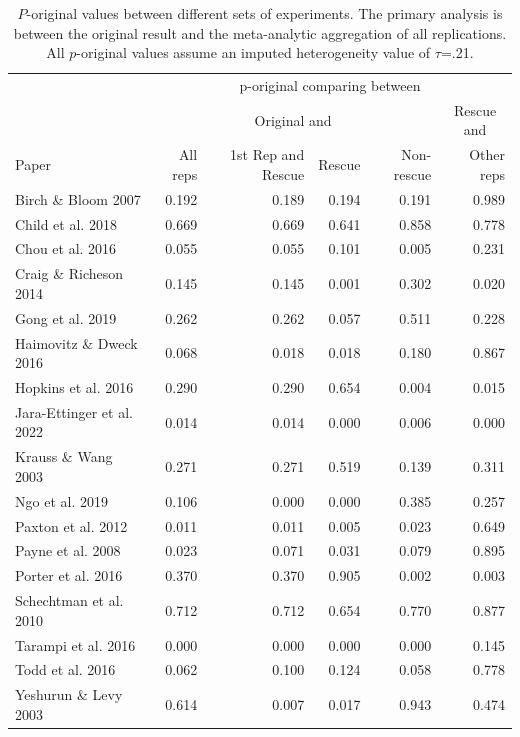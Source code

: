 \documentclass[
  english,
  a4paper,
]{article}
\begin{document}
\begin{table}

\caption{\label{tab:tab-porig}$P$-original values between different sets of experiments. The primary analysis is between the original result and the meta-analytic aggregation of all replications. All $p$-original values assume an imputed heterogeneity value of $\tau$=.21.}
\centering
\begin{tabular}[t]{lrrrrr}
\toprule
\multicolumn{1}{c}{ } & \multicolumn{5}{c}{p-original comparing between} \\
\cmidrule(l{3pt}r{3pt}){2-6}
\multicolumn{1}{c}{ } & \multicolumn{4}{c}{Original and} & \multicolumn{1}{c}{Rescue and} \\
\cmidrule(l{3pt}r{3pt}){2-5} \cmidrule(l{3pt}r{3pt}){6-6}
Paper & All reps & 1st Rep and Rescue & Rescue & Non-rescue & Other reps\\
\midrule
Birch \& Bloom 2007 & 0.192 & 0.189 & 0.194 & 0.191 & 0.989\\
Child et al. 2018 & 0.669 & 0.669 & 0.641 & 0.858 & 0.778\\
Chou et al. 2016 & 0.055 & 0.055 & 0.101 & 0.005 & 0.231\\
Craig \& Richeson 2014 & 0.145 & 0.145 & 0.001 & 0.302 & 0.020\\
Gong et al. 2019 & 0.262 & 0.262 & 0.057 & 0.511 & 0.228\\
Haimovitz \& Dweck 2016 & 0.068 & 0.018 & 0.018 & 0.180 & 0.867\\
Hopkins et al. 2016 & 0.290 & 0.290 & 0.654 & 0.004 & 0.015\\
Jara-Ettinger et al. 2022 & 0.014 & 0.014 & 0.000 & 0.006 & 0.000\\
Krauss \& Wang 2003 & 0.271 & 0.271 & 0.519 & 0.139 & 0.311\\
Ngo et al. 2019 & 0.106 & 0.000 & 0.000 & 0.385 & 0.257\\
Paxton et al. 2012 & 0.011 & 0.011 & 0.005 & 0.023 & 0.649\\
Payne et al. 2008 & 0.023 & 0.071 & 0.031 & 0.079 & 0.895\\
Porter et al. 2016 & 0.370 & 0.370 & 0.905 & 0.002 & 0.003\\
Schechtman et al. 2010 & 0.712 & 0.712 & 0.654 & 0.770 & 0.877\\
Tarampi et al. 2016 & 0.000 & 0.000 & 0.000 & 0.000 & 0.145\\
Todd et al. 2016 & 0.062 & 0.100 & 0.124 & 0.058 & 0.778\\
Yeshurun \& Levy 2003 & 0.614 & 0.007 & 0.017 & 0.943 & 0.474\\
\bottomrule
\end{tabular}
\end{table}
\end{document}
